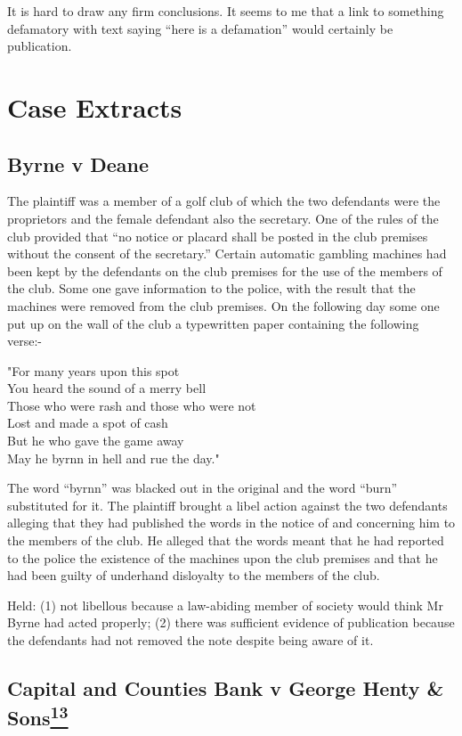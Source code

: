\documentclass[]{article}
\begin{document}
It is hard to draw any firm conclusions. It seems to me that a link to
something defamatory with text saying ``here is a defamation'' would
certainly be publication.

\section{Case Extracts}

\subsection{Byrne v Deane}

The plaintiff was a member of a golf club of which the two defendants
were the proprietors and the female defendant also the secretary. One of
the rules of the club provided that ``no notice or placard shall be
posted in the club premises without the consent of the secretary.''
Certain automatic gambling machines had been kept by the defendants on
the club premises for the use of the members of the club. Some one gave
information to the police, with the result that the machines were
removed from the club premises. On the following day some one put up on
the wall of the club a typewritten paper containing the following
verse:-

"For many years upon this spot\\You heard the sound of a merry
bell\\Those who were rash and those who were not\\Lost and made a spot
of cash\\But he who gave the game away\\May he byrnn in hell and rue the
day."

The word ``byrnn'' was blacked out in the original and the word ``burn''
substituted for it. The plaintiff brought a libel action against the two
defendants alleging that they had published the words in the notice of
and concerning him to the members of the club. He alleged that the words
meant that he had reported to the police the existence of the machines
upon the club premises and that he had been guilty of underhand
disloyalty to the members of the club.

Held: (1) not libellous because a law-abiding member of society would
think Mr Byrne had acted properly; (2) there was sufficient evidence of
publication because the defendants had not removed the note despite
being aware of it.

\subsection{\texorpdfstring{{{Capital and Counties Bank v George Henty
\&
Sons\hyperref[sdfootnote13sym]{\textsuperscript{13}}}}}{Capital and Counties Bank v George Henty \& Sons13}}
\end{document}

